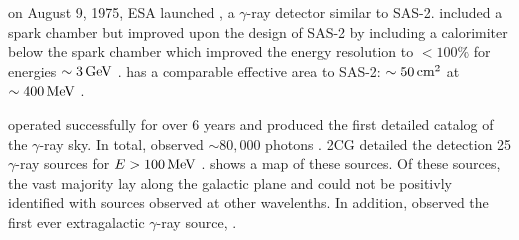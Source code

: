 

on August 9, 1975, \ac{ESA} launched \cosb, a $\gamma$-ray 
detector similar to \ac{SAS-2}. 
\cosb included a spark chamber but
improved upon the design of
\ac{SAS-2} by including a calorimiter below the spark chamber
which improved the energy resolution to $<100\%$ for energies $\sim
3\,\text{GeV}$ \citep{bignami_1975_cos-b-experiment}.
\cosb has a comparable effective area to \ac{SAS-2}:
$\sim 50\,\text{cm}^2$ at $\sim400\,\text{MeV}$
\citep{bignami_1975_cos-b-experiment}.  


\cosb operated successfully for over 6 years and produced the first
detailed catalog of the $\gamma$-ray sky.  In total, \cosb observed $\sim
80,000$ photons \cite{mayer-hasselwander_1982_large-scale-distribution}.
\ac{2CG} detailed
the detection 25 $\gamma$-ray sources for $E>100\,\text{MeV}$
\citep{swanenburg_1981_second-catalog}.  
shows a map of these sources.  Of these sources, the vast majority
lay along the galactic plane and could not be positivly identified
with sources observed at other wavelenths.  In addition, \cosb
observed the first ever extragalactic $\gamma$-ray source,
\citep[3C273,][]{swanenburg_1978_observation-high-energy}.

